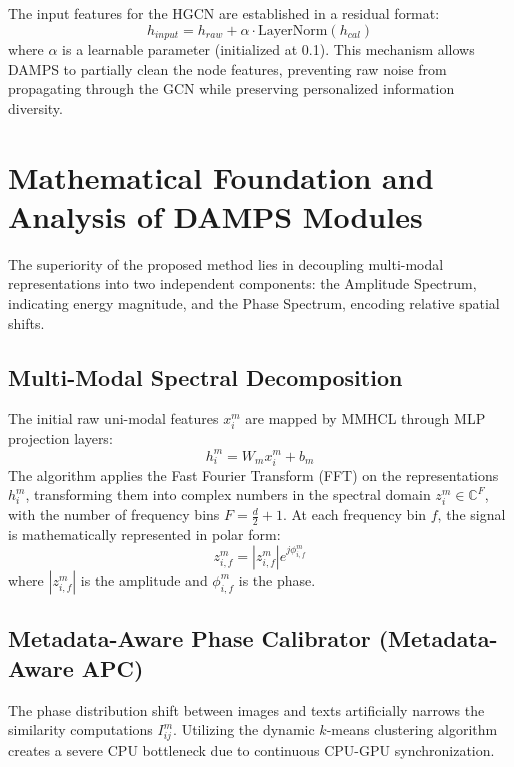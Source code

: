 \documentclass[12pt, a4paper]{article}
\begin{document}
The input features for the HGCN are established in a residual format:
\begin{equation}
h_{input} = h_{raw} + \alpha \cdot \text{LayerNorm}(h_{cal})
\end{equation}
where $\alpha$ is a learnable parameter (initialized at 0.1). This mechanism allows DAMPS to partially clean the node features, preventing raw noise from propagating through the GCN while preserving personalized information diversity.

\section{Mathematical Foundation and Analysis of DAMPS Modules}
The superiority of the proposed method lies in decoupling multi-modal representations into two independent components: the Amplitude Spectrum, indicating energy magnitude, and the Phase Spectrum, encoding relative spatial shifts.

\subsection{Multi-Modal Spectral Decomposition}
The initial raw uni-modal features $x_i^m$ are mapped by MMHCL through MLP projection layers:
\begin{equation}
h_i^m = W_m x_i^m + b_m
\end{equation}
The algorithm applies the Fast Fourier Transform (FFT) on the representations $h_i^m$, transforming them into complex numbers in the spectral domain $z_i^m \in \mathbb{C}^F$, with the number of frequency bins $F = \frac{d}{2} + 1$. At each frequency bin $f$, the signal is mathematically represented in polar form:
\begin{equation}
z_{i,f}^m = |z_{i,f}^m|e^{j\phi_{i,f}^m}
\end{equation}
where $|z_{i,f}^m|$ is the amplitude and $\phi_{i,f}^m$ is the phase.

\subsection{Metadata-Aware Phase Calibrator (Metadata-Aware APC)}
The phase distribution shift between images and texts artificially narrows the similarity computations $I_{ij}^{m}$. Utilizing the dynamic $k$-means clustering algorithm creates a severe CPU bottleneck due to continuous CPU-GPU synchronization.
\end{document}
